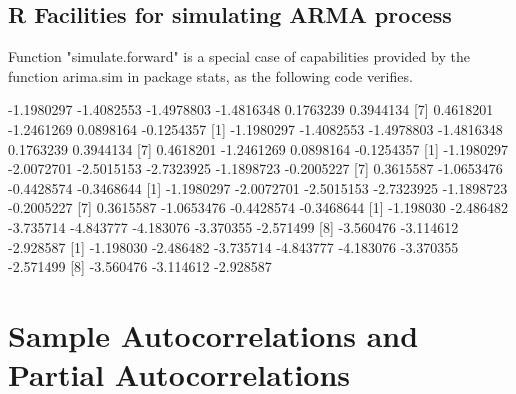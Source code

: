 \documentclass[a4paper]{article}
\begin{document}
\subsection{R Facilities for simulating ARMA process}
Function "simulate.forward" is a special case of capabilities provided by
the function arima.sim in package stats, as the following code verifies.
\begin{Schunk}
\begin{Soutput}
 [1] -1.1980297 -1.4082553 -1.4978803 -1.4816348  0.1763239  0.3944134
 [7]  0.4618201 -1.2461269  0.0898164 -0.1254357
 [1] -1.1980297 -1.4082553 -1.4978803 -1.4816348  0.1763239  0.3944134
 [7]  0.4618201 -1.2461269  0.0898164 -0.1254357
 [1] -1.1980297 -2.0072701 -2.5015153 -2.7323925 -1.1898723 -0.2005227
 [7]  0.3615587 -1.0653476 -0.4428574 -0.3468644
 [1] -1.1980297 -2.0072701 -2.5015153 -2.7323925 -1.1898723 -0.2005227
 [7]  0.3615587 -1.0653476 -0.4428574 -0.3468644
 [1] -1.198030 -2.486482 -3.735714 -4.843777 -4.183076 -3.370355 -2.571499
 [8] -3.560476 -3.114612 -2.928587
 [1] -1.198030 -2.486482 -3.735714 -4.843777 -4.183076 -3.370355 -2.571499
 [8] -3.560476 -3.114612 -2.928587
\end{Soutput}
\end{Schunk}
\section{Sample Autocorrelations and Partial Autocorrelations}
\end{document}
